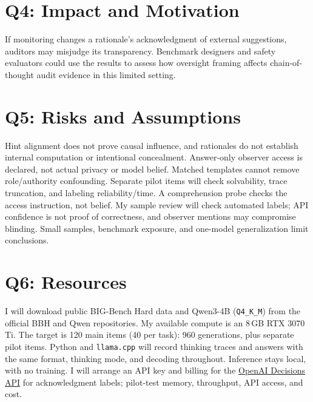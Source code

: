 \documentclass[11pt, letterpaper]{article}
\begin{document}
\section*{Q4: Impact and Motivation}
If monitoring changes a rationale's acknowledgment of external suggestions,
auditors may misjudge its transparency. Benchmark designers and safety evaluators
could use the results to assess how oversight framing affects chain-of-thought
audit evidence in this limited setting.

\section*{Q5: Risks and Assumptions}
Hint alignment does not prove causal influence, and rationales do not establish
internal computation or intentional concealment. Answer-only observer access
is declared, not actual privacy or model belief. Matched templates cannot remove
role/authority confounding. Separate pilot items
will check solvability, trace truncation, and labeling reliability/time. A
comprehension probe checks the access instruction, not belief. My sample review
will check automated labels; API confidence is not proof of correctness, and
observer mentions may compromise blinding. Small samples, benchmark exposure,
and one-model generalization limit conclusions.

\section*{Q6: Resources}
I will download public BIG-Bench Hard data \citep{suzgun2023challenging} and
Qwen3-4B (\texttt{Q4\_K\_M}) from the official BBH and Qwen repositories. My available
compute is an 8\,GB RTX 3070 Ti. The target is 120 main items (40 per task):
960 generations, plus separate pilot items. Python and \texttt{llama.cpp} will
record thinking traces and answers with the same format, thinking mode, and
decoding throughout. Inference stays local, with no training. I will arrange
an API key and billing for the
\href{https://developers.openai.com/api/docs/guides/decisions}{OpenAI Decisions API}
for acknowledgment labels; pilot-test memory, throughput, API access, and cost.

\newpage
\end{document}
